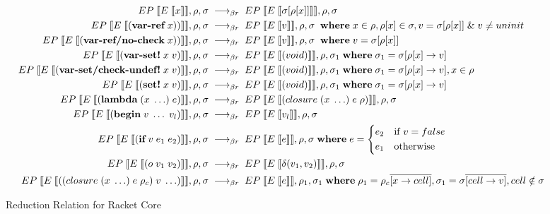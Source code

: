 \documentclass[sigplan,screen,anonymous]{acmart}
\def\dash {\text{-}}
\begin{document}
\newcommand{\rcinput}[1]{EP\;\llbracket E\;\llbracket #1 \rrbracket \rrbracket, \rho, \sigma\;}
\newcommand{\rcoutput}[3]{EP\;\llbracket E\;\llbracket #1 \rrbracket \rrbracket, #2, #3\;}
\def\rcrel {&\longrightarrow_{\beta r}\;}

\def\where {\textbf{where}\;}
\def\rel {&\longrightarrow_{\beta p}\;}

\begin{figure*}[tbp]
  \begin{align*}
    \rcinput{x} \rcrel \rcoutput{\sigma[\rho[x]]}{\rho}{\sigma} \\
    \rcinput{(\textbf{var\dash ref}\; x))} \rcrel \rcoutput{v}{\rho}{\sigma}\; \where x \in \rho, \rho[x] \in \sigma, v = \sigma[\rho[x]]\; \&\; v \neq uninit\\
    \rcinput{(\textbf{var\dash ref/no\dash check}\; x))} \rcrel \rcoutput{v}{\rho}{\sigma}\; \where v = \sigma[\rho[x]] \\
    \rcinput{(\textbf{var\dash set!}\; x\; v)} \rcrel \rcoutput{(void)}{\rho}{\sigma_1} \where \sigma_1 = \sigma[\rho[x]\rightarrow v]\\
    \rcinput{(\textbf{var\dash set/check\dash undef!}\; x\; v)} \rcrel \rcoutput{(void)}{\rho}{\sigma_1} \where \sigma_1 = \sigma[\rho[x]\rightarrow v], x \in \rho\\
    \rcinput{(\textbf{set!}\; x\; v)} \rcrel \rcoutput{(void)}{\rho}{\sigma_1} \where \sigma_1 = \sigma[\rho[x]\rightarrow v]\\
    \rcinput{(\textbf{lambda}\; (x\; \ldots)\; e)} \rcrel \rcoutput{(closure\; (x\; \ldots)\; e\; \rho)}{\rho}{\sigma} \\
    \rcinput{(\textbf{begin}\; v\; \ldots\; v_l)} \rcrel \rcoutput{v_l}{\rho}{\sigma} \\
    \rcinput{(\textbf{if}\; v\; e_1\; e_2)} \rcrel \rcoutput{e}{\rho}{\sigma} \where e = \begin{cases*}
      e_2 & if $v = false$ \\
      e_1 & otherwise
    \end{cases*}\\
    \rcinput{(o\; v_1\; v_2)} \rcrel \rcoutput{\delta(v_1,v_2)}{\rho}{\sigma} \\
    \rcinput{((closure\; (x\; \ldots)\; e\; \rho_c)\;v\;\ldots)} \rcrel \rcoutput{e}{\rho_1}{\sigma_1} \where \rho_1 = \rho_c\overline{[x\rightarrow cell]}, \sigma_1 = \sigma\overline{[cell\rightarrow v]}, cell \notin \sigma \\
  \end{align*}
  \caption{Reduction Relation for Racket Core}
  \label{fig:rc-reduction}
\end{figure*}
\end{document}
